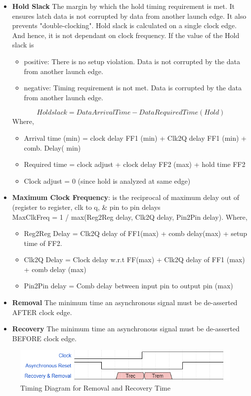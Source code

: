\begin{itemize}
    \item \textbf{Hold Slack} The margin by which the hold timing requirement is met. It ensures latch data is not corrupted by data from another launch edge. It also prevents "double-clocking". Hold slack is calculated on a single clock edge. And hence, it is not dependant on clock frequency. If the value of the Hold slack is 
    \begin{itemize}
        \item positive: There is no setup violation. Data is not corrupted by the data from another launch edge.
        \item negative: Timing requirement is not met. Data is corrupted by the data from another launch edge.
    \end{itemize}
    \[ Hold slack = Data Arrival Time - Data Required Time(Hold)\]
    Where,
    \begin{itemize}
        \item Arrival time (min) = clock delay FF1 (min) + Clk2Q delay FF1 (min) + comb. Delay( min)
        \item Required time = clock adjust + clock delay FF2 (max) + hold time FF2
        \item Clock adjust = 0 (since hold is analyzed at same edge)
    \end{itemize}
    \item \textbf{Maximum Clock Frequency}: is the reciprocal of maximum delay out of (register to register, clk to q, \& pin to pin delays\\ 
    MaxClkFreq = 1 / max(Reg2Reg delay, Clk2Q delay, Pin2Pin delay). Where,
    \begin{itemize}
        \item Reg2Reg Delay = Clk2Q delay of FF1(max) + comb delay(max) + setup time of FF2.
        \item Clk2Q Delay = Clock delay w.r.t FF(max) + Clk2Q delay of FF1 (max) + comb delay (max)
        \item Pin2Pin delay = Comb delay between input pin to output pin (max)
    \end{itemize}             
    \item \textbf{Removal} The minimum time an asynchronous signal must be de-asserted AFTER clock edge.
    \item \textbf{Recovery} The minimum time an asynchronous signal must be de-asserted BEFORE clock edge.
\end{itemize}

\begin{figure}[H]
\begin{center}
\includegraphics[width=\textwidth]{images/TimingRR.png}
\caption{Timing Diagram for Removal and Recovery Time}
\label{TimingRR}
\end{center}
\end{figure}

